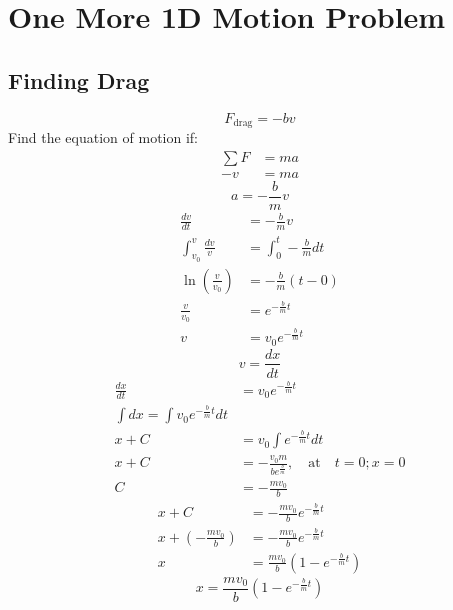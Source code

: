 \documentclass{article}
\begin{document}
\newcommand{\hr}{\par\noindent\rule{\textwidth}{0.4pt}}

\newcommand{\bc}[1]{
	\begin{equation*}
		\begin{boxed}
			{#1}
		\end{boxed}
	\end{equation*}
}

\newcommand{\cond}[2]{
	\ifmmode
		{#1} \quad {#2}
	\else
		$$ {#1} \quad {#2} $$
	\fi
}

\tableofcontents

\section{One More 1D Motion Problem}

\subsection{Finding Drag}

\begin{equation}
	F_\text{drag} = -bv
\end{equation}
Find the equation of motion if:
\begin{align*}
	\sum F & = ma \\
	-v & = ma
\end{align*}
\begin{equation}
	a = -\frac{b}{m}v
\end{equation}
\begin{align*}
	\frac{dv}{dt} & = -\frac{b}{m}v \\
	\int_{v_0}^v \frac{dv}{v} & = \int_0^t -\frac{b}{m}dt \\
	\ln\left(\frac{v}{v_0}\right) & = -\frac{b}{m}(t - 0) \\
	\frac{v}{v_0} & = e^{-\frac{b}{m}t} \\
	v & = v_0e^{-\frac{b}{m}t}
\end{align*}
\begin{equation}
	v = \frac{dx}{dt}
\end{equation}
\begin{align*}
	\frac{dx}{dt} & = v_0e^{-\frac{b}{m}t} \\
	\int dx = \int v_0e^{-\frac{b}{m}t}dt \\
	x + C & = v_0 \int e^{-\frac{b}{m}t}dt \\
	x + C & = -\frac{v_0m}{be^{\frac{b}{m}}}, \quad \text{at} \quad t = 0; x = 0 \\
	C & = -\frac{mv_0}{b}
\end{align*}
\begin{align*}
	x + C & = -\frac{mv_0}{b}e^{-\frac{b}{m}t} \\
	x + \left( -\frac{mv_0}{b} \right) & = -\frac{mv_0}{b}e^{-\frac{b}{m}t} \\
	x & = \frac{mv_0}{b} \left( 1 - e^{-\frac{b}{m}t} \right)
\end{align*}
\begin{equation}
	x = \frac{mv_0}{b} \left( 1 - e^{-\frac{b}{m}t} \right)
\end{equation}
\end{document}
